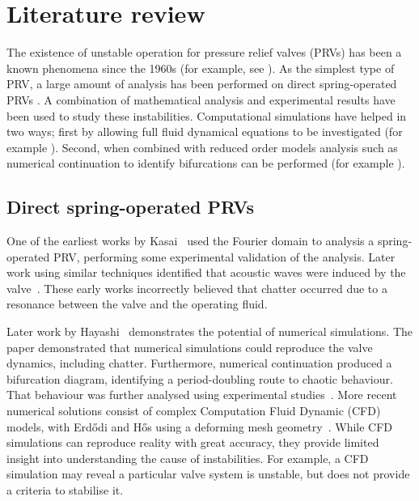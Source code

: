 \section{Literature review}


The existence of unstable operation for pressure relief valves (PRVs) has been a known phenomena since the 1960s (for example, see \cite{Kasai1968OnSystem}).
As the simplest type of  PRV, a large amount of analysis has been performed on direct spring-operated PRVs \cite{Kasai1968OnSystem,Thomann1976OscillationsPipe,Hayashi1995InstabilityCircuit,Darby2013TheModel,Bazso2013AnValve,Erdodi2017PredictionModelling,Hos2015ModelPipe,Hos2017DynamicRecommendations}. A combination of mathematical analysis and experimental results have been used to study these instabilities. Computational simulations have helped  in two ways; first by allowing full fluid dynamical equations
to be investigated (for example \cite{Erdodi2017PredictionModelling,Hos2015ModelPipe}). Second, when combined with reduced order models analysis such as numerical continuation to identify bifurcations can be performed (for example \cite{Hos2015DynamicModelling}).

\subsection{Direct spring-operated PRVs}

One of the earliest works by Kasai~\cite{Kasai1968OnSystem} used the Fourier domain to analysis a spring-operated PRV, performing some experimental validation of the analysis. Later work using similar techniques identified that acoustic waves were induced by the valve~\cite{Thomann1976OscillationsPipe}. These early works incorrectly believed that chatter occurred due to a resonance between the valve and the operating fluid.

Later work by Hayashi~\cite{Hayashi1995InstabilityCircuit} demonstrates the potential of numerical simulations. The paper demonstrated that numerical simulations could reproduce the valve dynamics, including chatter. Furthermore, numerical continuation produced a bifurcation diagram, identifying a period-doubling route to chaotic behaviour. That behaviour was further analysed using experimental studies~\cite{Bazso2013AnValve}. More recent numerical solutions consist of complex Computation Fluid Dynamic (CFD) models, with Erd\H{o}di and H\H{o}s using a deforming mesh geometry~\cite{Erdodi2017PredictionModelling}. While CFD simulations can reproduce reality with great accuracy, they provide limited insight into understanding the cause of instabilities. For example, a CFD simulation may reveal a particular valve system is unstable, but does not provide a criteria to stabilise it.

